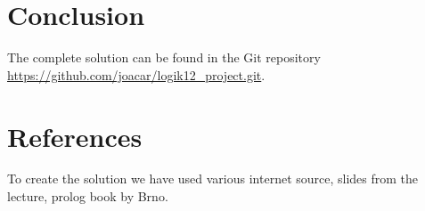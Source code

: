 \documentclass[a4paper,12pt]{article}
\begin{document}
\section*{Conclusion}
The complete solution can be found in the Git repository \url{https://github.com/joacar/logik12_project.git}.

\section*{References}
To create the solution we have used various internet source, slides from the lecture, prolog book by Brno.
\end{document}
